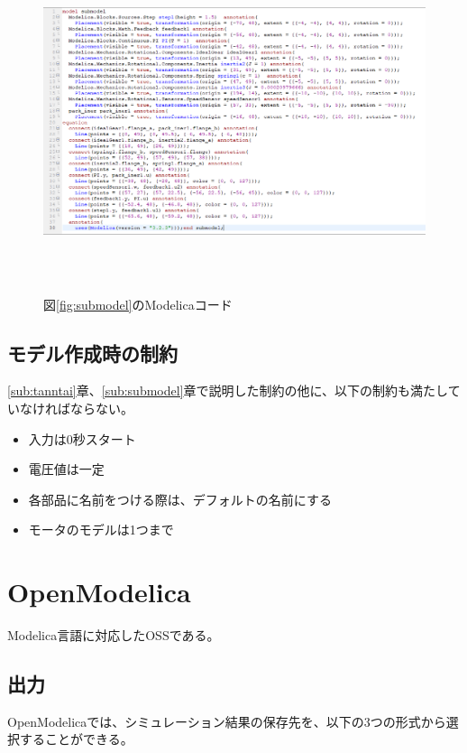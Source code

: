  \begin{figure}[t]
	\centering
	\includegraphics[width=16.5cm,height=10cm]{./Image/sub_modelica.png}
	\caption{図\ref{fig:submodel}のModelicaコード}
	\label{fig:sub_modelica}
  \end{figure}

  \subsection{モデル作成時の制約}\label{sub:seiyaku}
  \ref{sub:tanntai}章、\ref{sub:submodel}章で説明した制約の他に、以下の制約も満たしていなければならない。

  \begin{itemize}
	  \item 入力は0秒スタート
	  \item 電圧値は一定
	  \item 各部品に名前をつける際は、デフォルトの名前にする
	  \item モータのモデルは1つまで
  \end{itemize}


\section{OpenModelica}\label{OM}
Modelica言語に対応したOSSである\cite{fritzson2006openmodelica}。

\subsection{出力}\label{output}
OpenModelicaでは、シミュレーション結果の保存先を、以下の3つの形式から選択することができる。

